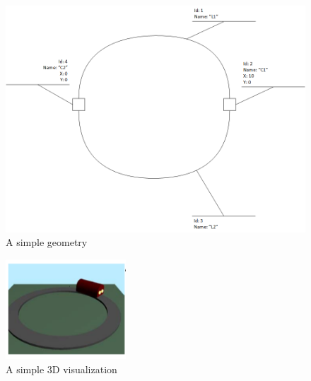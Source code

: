 \begin{figure}[htp]
	\begin{center}
		\includegraphics[width=\textwidth]{image/example_petrinet_geometry.png}
		\caption{A simple geometry}
		\label{fig:example_petrinet_geometry}
	\end{center}
\end{figure}


\begin{figure}[htp]
\begin{center}
  \includegraphics[width=0.4\textwidth]{image/3d.png}
  \caption{A simple 3D visualization}
  \label{fig:example_3d}
\end{center}
\end{figure}

%

